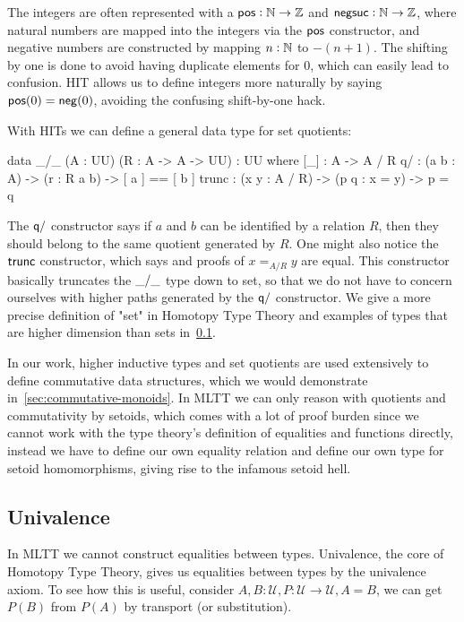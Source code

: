 The integers are often represented with a $\operatorname{\mathsf{pos}} : \mathbb{N} \to \mathbb{Z}$
and $\operatorname{\mathsf{negsuc}} : \mathbb{N} \to \mathbb{Z}$, where natural numbers
are mapped into the integers via the $\operatorname{\mathsf{pos}}$ constructor, and negative numbers are constructed
by mapping $n : \mathbb{N}$ to $-(n + 1)$. The shifting by one is done to avoid having duplicate elements
for 0, which can easily lead to confusion. HIT allows us to define integers more naturally by saying
$\operatorname{\mathsf{pos}}(0) = \operatorname{\mathsf{neg}}(0)$, avoiding the confusing shift-by-one hack.

With HITs we can define a general data type for set quotients:
\begin{code}
data _/_ (A : UU) (R : A -> A -> UU) : UU where
    [_]  : A -> A / R
    q/ : (a b : A) -> (r : R a b) -> [ a ] == [ b ]
    trunc : (x y : A / R) -> (p q : x = y) -> p = q
\end{code}

The $\operatorname{\mathsf{q/}}$ constructor says if $a$ and $b$ can be identified by a relation $R$, then
they should belong to the same quotient generated by $R$.
One might also notice the $\operatorname{\mathsf{trunc}}$ constructor, which says and proofs of $x =_{A/R} y$ are equal.
This constructor basically truncates the $\operatorname{\mathsf{\_/\_}}$ type down to set, so that we do not have to
concern ourselves with higher paths generated by the $\operatorname{\mathsf{q/}}$ constructor.
We give a more precise definition of "set" in Homotopy Type Theory and examples of types that are
higher dimension than sets in~\cref{types:univalence}.

In our work, higher inductive types and set quotients are used extensively to define commutative
data structures, which we would demonstrate in~\cref{sec:commutative-monoids}. In MLTT we can only
reason with quotients and commutativity by setoids, which comes with a lot of proof burden
since we cannot work with the type theory's definition of equalities and functions directly,
instead we have to define our own equality relation and define our own type for setoid homomorphisms,
giving rise to the infamous setoid hell.

\subsection{Univalence}\label{types:univalence}
In MLTT we cannot construct equalities between types. Univalence, the core of Homotopy Type Theory,
gives us equalities between types by the univalence axiom. To see how this is useful,
consider $A, B : \mathcal{U}, P : \mathcal{U} \rightarrow \mathcal{U}, A = B$, we can
get $P(B)$ from $P(A)$ by transport (or substitution).  

